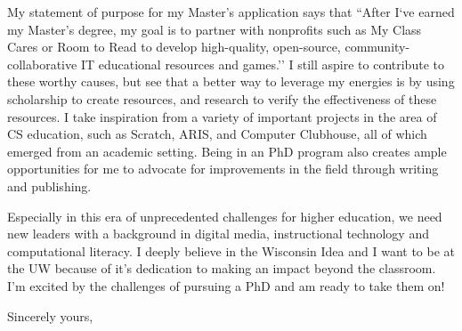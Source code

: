 \documentclass[12pt]{letter}
\begin{document}
\begin{letter}
My statement of purpose for my Master’s application says that ``After I`ve earned my Master's degree, my goal is to partner with nonprofits such as My Class Cares or Room to Read to develop high-quality, open-source, community-collaborative IT educational resources and games.'' I still aspire to contribute to these worthy causes, but see that a better way to leverage my energies is by using scholarship to create resources, and research to verify the effectiveness of these resources. I take inspiration from a variety of important projects in the area of CS education, such as Scratch, ARIS, and Computer Clubhouse, all of which emerged from an academic setting. Being in an PhD program also creates ample opportunities for me to advocate for improvements in the field through writing and publishing. 

Especially in this era of unprecedented challenges for higher education, we need new leaders with a background in digital media, instructional technology and computational literacy. I deeply believe in the Wisconsin Idea and I want to be at the UW because of it’s dedication to making an impact beyond the classroom. I’m excited by the challenges of pursuing a PhD and am ready to take them on!

\closing{Sincerely yours,}









\end{letter}
\end{document}
